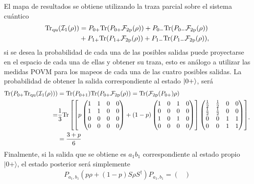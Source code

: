    
 El mapa de resultados se obtiene utilizando la traza parcial sobre el sistema cuántico \[\begin{split}{\rm Tr}_{\text{qu}}(\mathcal{I}_1(\rho))&=P_{0+}{\rm Tr}(P_{0+}\mathcal{F}_{2\text{p}}(\rho))+P_{0-}{\rm Tr}(P_{0-}\mathcal{F}_{2\text{p}}(\rho))\\
        &+ P_{1+}{\rm Tr}(P_{1+}\mathcal{F}_{2\text{p}}(\rho))+P_{1-}{\rm Tr}( P_{1-}\mathcal{F}_{2\text{p}}(\rho)), \\\end{split}\]si se desea la probabilidad de cada una de las posibles salidas puede proyectarse en el espacio de cada una de ellas y obtener su traza, esto es análogo a utilizar las medidas POVM para los mapeos de cada una de las cuatro posibles salidas. La probabilidad de obtener la salida correspondiente al estado $|0+\rangle$, será \[\begin{split}{\rm Tr}(P_{0+}{\rm Tr}_{\text{qu}}(\mathcal{I}_1(\rho)))&={\rm Tr}(P_{0+1}){\rm Tr}(P_{0+}\mathcal{F}_{2\text{p}}(\rho))={\rm Tr}(\mathcal{F}_{2\text{p}}(P_{0+})\rho)\\=&\frac{1}{3}{\rm Tr}\left[\left[p\begin{pmatrix}
            1&1&0&0\\
            1&1&0&0\\
            0&0&0&0\\
            0&0&0&0\\
        \end{pmatrix}+ (1-p)\begin{pmatrix}
            1&0&1&0\\
            0&0&0&0\\
            1&0&1&0\\
            0&0&0&0\\
        \end{pmatrix}\right]\begin{pmatrix}
            \tfrac{1}{2}&\tfrac{1}{2}&0&0\\
            \tfrac{1}{2}&\tfrac{1}{2}&0&0\\
            0&0&1&1\\
            0&0&1&1\\
        \end{pmatrix}\right]\\
        &=\frac{3+p}{6}\end{split}.\] Finalmente, si la salida que se obtiene es $a_1 b_1$ correspondiente al estado propio  $|0+\rangle$, el estado posterior será simplemente\[\begin{split}P_{a_1,b_1}(p\rho+(1-p)S\rho S^\dagger) P_{a_1,b_1}=\begin{pmatrix}

\end{pmatrix}
\end{split}\]
